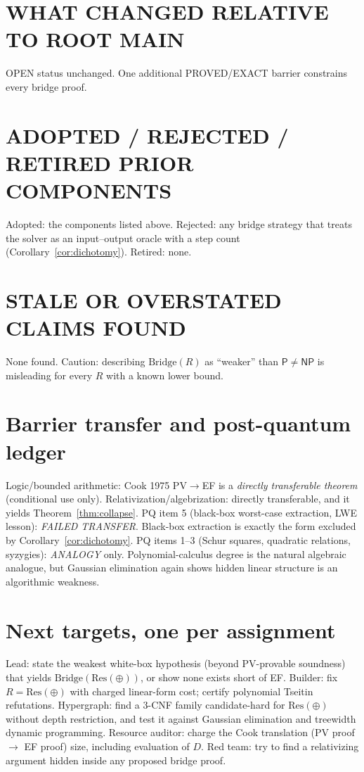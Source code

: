 \documentclass[11pt]{article}
\theoremstyle{definition}
\begin{document}
\section*{WHAT CHANGED RELATIVE TO ROOT MAIN}
OPEN status unchanged. One additional PROVED/EXACT barrier constrains every bridge proof.

\section*{ADOPTED / REJECTED / RETIRED PRIOR COMPONENTS}
Adopted: the components listed above. Rejected: any bridge strategy that treats the solver as an
input--output oracle with a step count (Corollary~\ref{cor:dichotomy}). Retired: none.

\section*{STALE OR OVERSTATED CLAIMS FOUND}
None found. Caution: describing $\mathrm{Bridge}(R)$ as ``weaker'' than $\mathsf P\ne\mathsf{NP}$ is
misleading for every $R$ with a known lower bound.

\section*{Barrier transfer and post-quantum ledger}
Logic/bounded arithmetic: Cook 1975 PV$\to$EF is a \emph{directly transferable theorem} (conditional use only).
Relativization/algebrization: directly transferable, and it yields Theorem~\ref{thm:collapse}.
PQ item 5 (black-box worst-case extraction, LWE lesson): \emph{FAILED TRANSFER}. Black-box extraction is
exactly the form excluded by Corollary~\ref{cor:dichotomy}. PQ items 1--3 (Schur squares, quadratic
relations, syzygies): \emph{ANALOGY} only. Polynomial-calculus degree is the natural algebraic analogue,
but Gaussian elimination again shows hidden linear structure is an algorithmic weakness.

\section*{Next targets, one per assignment}
Lead: state the weakest white-box hypothesis (beyond PV-provable soundness) that yields
$\mathrm{Bridge}(\mathrm{Res}(\oplus))$, or show none exists short of EF.
Builder: fix $R=\mathrm{Res}(\oplus)$ with charged linear-form cost; certify polynomial Tseitin refutations.
Hypergraph: find a 3-CNF family candidate-hard for $\mathrm{Res}(\oplus)$ without depth restriction, and
test it against Gaussian elimination and treewidth dynamic programming.
Resource auditor: charge the Cook translation (PV proof $\to$ EF proof) size, including evaluation of $D$.
Red team: try to find a relativizing argument hidden inside any proposed bridge proof.
\end{document}
